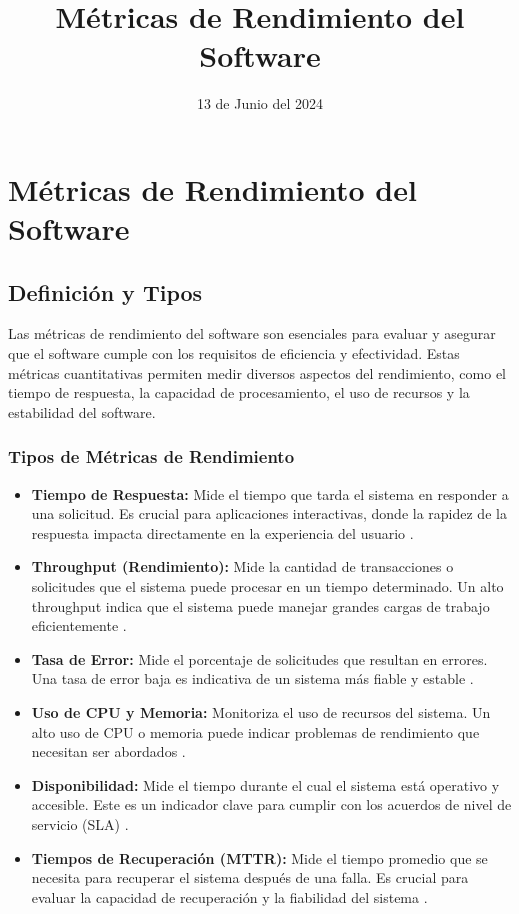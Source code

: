 \documentclass{article}
\title{Métricas de Rendimiento del Software}
\date{13 de Junio del 2024}
\begin{document}
\maketitle

\section{Métricas de Rendimiento del Software}

\subsection{Definición y Tipos}

Las métricas de rendimiento del software son esenciales para evaluar y asegurar que el software cumple con los requisitos de eficiencia y efectividad. Estas métricas cuantitativas permiten medir diversos aspectos del rendimiento, como el tiempo de respuesta, la capacidad de procesamiento, el uso de recursos y la estabilidad del software.

\subsubsection{Tipos de Métricas de Rendimiento}
\begin{itemize}
    \item \textbf{Tiempo de Respuesta:} Mide el tiempo que tarda el sistema en responder a una solicitud. Es crucial para aplicaciones interactivas, donde la rapidez de la respuesta impacta directamente en la experiencia del usuario \parencite{gorton2011essential}.
    \item \textbf{Throughput (Rendimiento):} Mide la cantidad de transacciones o solicitudes que el sistema puede procesar en un tiempo determinado. Un alto throughput indica que el sistema puede manejar grandes cargas de trabajo eficientemente \parencite{jones2017economics}.
    \item \textbf{Tasa de Error:} Mide el porcentaje de solicitudes que resultan en errores. Una tasa de error baja es indicativa de un sistema más fiable y estable \parencite{devsecops2019}.
    \item \textbf{Uso de CPU y Memoria:} Monitoriza el uso de recursos del sistema. Un alto uso de CPU o memoria puede indicar problemas de rendimiento que necesitan ser abordados \parencite{scalability2019}.
    \item \textbf{Disponibilidad:} Mide el tiempo durante el cual el sistema está operativo y accesible. Este es un indicador clave para cumplir con los acuerdos de nivel de servicio (SLA) \parencite{performance2019}.
    \item \textbf{Tiempos de Recuperación (MTTR):} Mide el tiempo promedio que se necesita para recuperar el sistema después de una falla. Es crucial para evaluar la capacidad de recuperación y la fiabilidad del sistema \parencite{gorton2011essential}.
\end{itemize}
\end{document}
